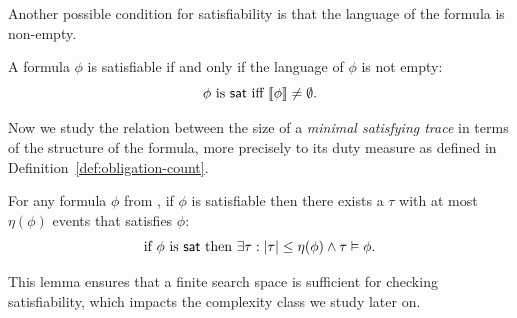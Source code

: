 Another possible condition for satisfiability is that the language of the formula is non-empty.
\begin{remark}
 A formula $\phi$ is satisfiable if and only if the language of $\phi$ is not empty: 
$$\phi \text{ is } \mathsf{sat}  \text{ iff } \llbracket \phi \rrbracket\neq \emptyset.$$
\end{remark}
Now we study the relation between the size of a  \emph{minimal satisfying trace} in terms of the structure of the formula, more precisely to its duty measure as defined in Definition~\ref{def:obligation-count}.
\begin{lemma}\label{numberofob}
    For any formula $\phi$ from \TDDLfm, if $\phi$ is satisfiable then there exists a  \timedword $\tau$ with at most $\eta(\phi)$ events that satisfies $\phi$:
    \[
\text{if } \phi \text{ is } \mathsf{sat}  \text{ then } \exists \tau : \vert \tau\vert \leq \eta(\phi) \wedge \tau \vDash  \phi.
    \]
\end{lemma}
This lemma ensures that a finite search space is sufficient for checking satisfiability, which impacts the complexity class we study later on.

